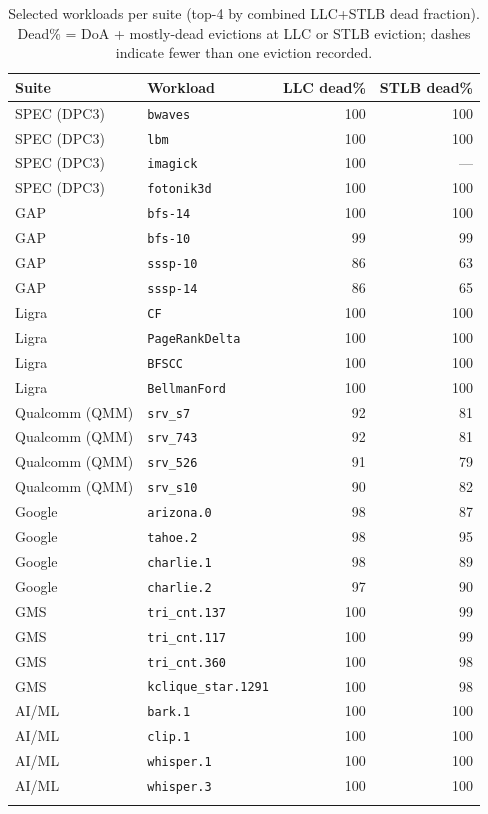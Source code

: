 \begin{table}[tbp]
\caption{Selected workloads per suite (top-4 by combined LLC+STLB dead fraction).  Dead\% = DoA + mostly-dead evictions at LLC or STLB eviction;
           dashes indicate fewer than one eviction recorded.}
\label{tab:selected_workloads}
\centering\small
\begin{tabular}{llrr}
\toprule
Suite & Workload & LLC dead\% & STLB dead\% \\
\midrule
  SPEC (DPC3) & \texttt{bwaves} & 100 & 100 \\
  SPEC (DPC3) & \texttt{lbm} & 100 & 100 \\
  SPEC (DPC3) & \texttt{imagick} & 100 & --- \\
  SPEC (DPC3) & \texttt{fotonik3d} & 100 & 100 \\
\addlinespace
  GAP & \texttt{bfs-14} & 100 & 100 \\
  GAP & \texttt{bfs-10} & 99 & 99 \\
  GAP & \texttt{sssp-10} & 86 & 63 \\
  GAP & \texttt{sssp-14} & 86 & 65 \\
\addlinespace
  Ligra & \texttt{CF} & 100 & 100 \\
  Ligra & \texttt{PageRankDelta} & 100 & 100 \\
  Ligra & \texttt{BFSCC} & 100 & 100 \\
  Ligra & \texttt{BellmanFord} & 100 & 100 \\
\addlinespace
  Qualcomm (QMM) & \texttt{srv\_s7} & 92 & 81 \\
  Qualcomm (QMM) & \texttt{srv\_743} & 92 & 81 \\
  Qualcomm (QMM) & \texttt{srv\_526} & 91 & 79 \\
  Qualcomm (QMM) & \texttt{srv\_s10} & 90 & 82 \\
\addlinespace
  Google & \texttt{arizona.0} & 98 & 87 \\
  Google & \texttt{tahoe.2} & 98 & 95 \\
  Google & \texttt{charlie.1} & 98 & 89 \\
  Google & \texttt{charlie.2} & 97 & 90 \\
\addlinespace
  GMS & \texttt{tri\_cnt.137} & 100 & 99 \\
  GMS & \texttt{tri\_cnt.117} & 100 & 99 \\
  GMS & \texttt{tri\_cnt.360} & 100 & 98 \\
  GMS & \texttt{kclique\_star.1291} & 100 & 98 \\
\addlinespace
  AI/ML & \texttt{bark.1} & 100 & 100 \\
  AI/ML & \texttt{clip.1} & 100 & 100 \\
  AI/ML & \texttt{whisper.1} & 100 & 100 \\
  AI/ML & \texttt{whisper.3} & 100 & 100 \\
\addlinespace
\bottomrule
\end{tabular}
\end{table}
